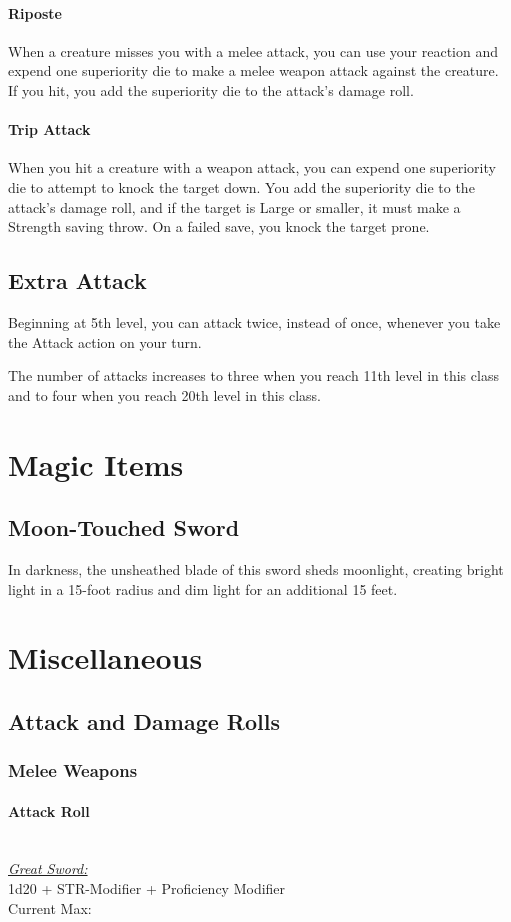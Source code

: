 {\paragraph*{Riposte}
When a creature misses you with a melee attack, you can use your reaction and expend one superiority die to make a melee weapon attack against the creature. If you hit, you add the superiority die to the attack's damage roll.
\paragraph*{Trip Attack}
When you hit a creature with a weapon attack, you can expend one superiority die to attempt to knock the target down. You add the superiority die to the attack's damage roll, and if the target is Large or smaller, it must make a Strength saving throw. On a failed save, you knock the target prone.

\subsection*{Extra Attack}
Beginning at 5th level, you can attack twice, instead of once, whenever you take the Attack action on your turn.

The number of attacks increases to three when you reach 11th level in this class and to four when you reach 20th level in this class.

\section*{Magic Items}
\subsection*{Moon-Touched Sword}
In darkness, the unsheathed blade of this sword sheds moonlight, creating bright light in a 15-foot radius and dim light for an additional 15 feet.

\section*{Miscellaneous}
\subsection*{Attack and Damage Rolls}
\subsubsection*{Melee Weapons}
\paragraph*{Attack Roll}\hfill\\
\underline{\textit{Great Sword:}}\\
1d20 + STR-Modifier + Proficiency Modifier\\
\indent Current Max: 
}
